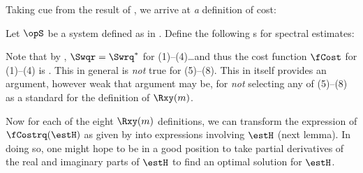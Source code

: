 Taking cue from the result of , we arrive at \emph{a} definition of cost:

\begin{definition}
\label{def:fCost}
Let $\opS$ be a system defined as in .
Define the following s for spectral  estimates:
\end{definition}

\begin{remark}
Note that by , $\Swqr=\Swrq^\ast$ for (1)--(4)\ldots and thus 
the cost function $\fCost$ for (1)--(4) is . 
This in general is \emph{not} true for (5)--(8).
This in itself provides an argument, however weak that argument may be, 
for \emph{not} selecting any of (5)--(8) as a standard for the definition of $\Rxy(m)$.
\end{remark}

Now for each of the eight $\Rxy(m)$ definitions, we can transform the expression of $\fCostrq(\estH)$
as given by  into expressions involving $\estH$ (next lemma). 
In doing so, one might hope to be in a good position to take partial derivatives of the real and imaginary parts of $\estH$
to find an optimal  solution for $\estH$.

